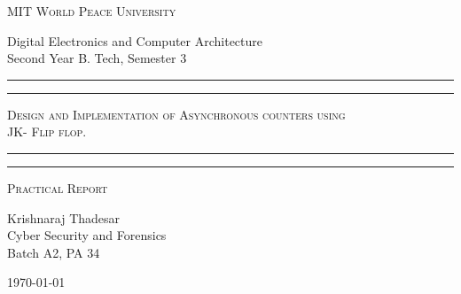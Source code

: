 \documentclass[11pt]{article}
\begin{document}
\begin{titlepage}
	\centering


	\huge\textsc{
		MIT World Peace University
	}\\

	\vspace{0.75\baselineskip} %

	\LARGE{
		Digital Electronics and Computer Architecture\\
		Second Year B. Tech, Semester 3
	}

	\vfill %


	\rule{\textwidth}{1.6pt}\vspace*{-\baselineskip}\vspace*{2pt}
	\rule{\textwidth}{0.6pt}
	\vspace{0.75\baselineskip} %



	\huge{\textsc{
			Design and Implementation of Asynchronous counters using\\ JK- Flip flop.
		}} \\



	\vspace{0.5\baselineskip} %
	\rule{\textwidth}{0.6pt}\vspace*{-\baselineskip}\vspace*{2.8pt}
	\rule{\textwidth}{1.6pt}

	\vspace{1\baselineskip} %


	\LARGE\textsc{
		Practical Report
	} %
	\vfill


	\vspace{0.5\baselineskip} %

	\Large{
		Krishnaraj Thadesar \\
		Cyber Security and Forensics\\
		Batch A2, PA 34
	}


	\vspace{0.5\baselineskip} %
	\today

\end{titlepage}
\end{document}
